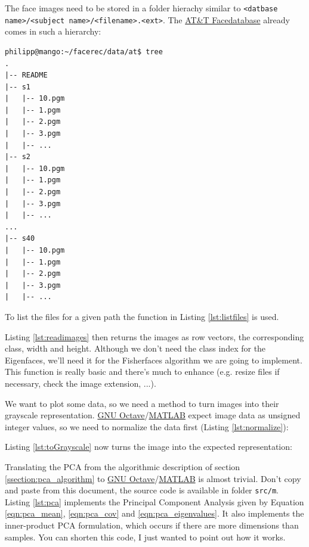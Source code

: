 The face images need to be stored in a folder hierachy similar to \lstinline|<datbase name>/<subject name>/<filename>.<ext>|. The \href{http://www.cl.cam.ac.uk/research/dtg/attarchive/facedatabase.html}{AT\&T Facedatabase} already comes in such a hierarchy:

\begin{lstlisting}
philipp@mango:~/facerec/data/at$ tree
.
|-- README
|-- s1
|   |-- 10.pgm
|   |-- 1.pgm
|   |-- 2.pgm
|   |-- 3.pgm
|   |-- ...
|-- s2
|   |-- 10.pgm
|   |-- 1.pgm
|   |-- 2.pgm
|   |-- 3.pgm
|   |-- ...
...
|-- s40
|   |-- 10.pgm
|   |-- 1.pgm
|   |-- 2.pgm
|   |-- 3.pgm
|   |-- ...
\end{lstlisting}


To list the files for a given path the function in Listing \ref{lst:listfiles} is used.



Listing \ref{lst:readimages} then returns the images as row vectors, the corresponding class, width and height. Although we don't need the class index for the Eigenfaces, we'll need it for the Fisherfaces algorithm we are going to implement. This function is really basic and there's much to enhance (e.g. resize files if necessary, check the image extension, ...).



We want to plot some data, so we need a method to turn images into their grayscale representation. \href{http://www.gnu.org/software/octave/}{GNU Octave}/\href{http://www.mathworks.com}{MATLAB} expect image data as unsigned integer values, so we need to normalize the data first (Listing \ref{lst:normalize}):



Listing \ref{lst:toGrayscale} now turns the image into the expected representation:



Translating the PCA from the algorithmic description of section \ref{ssection:pca_algorithm} to \href{http://www.gnu.org/software/octave/}{GNU Octave}/\href{http://www.mathworks.com}{MATLAB} is almost trivial. Don't copy and paste from this document, the source code is available in folder \lstinline|src/m|. Listing \ref{lst:pca} implements the Principal Component Analysis given by Equation \ref{eqn:pca_mean}, \ref{eqn:pca_cov} and \ref{eqn:pca_eigenvalues}. It also implements the inner-product PCA formulation, which occurs if there are more dimensions than samples. You can shorten this code, I just wanted to point out how it works.

